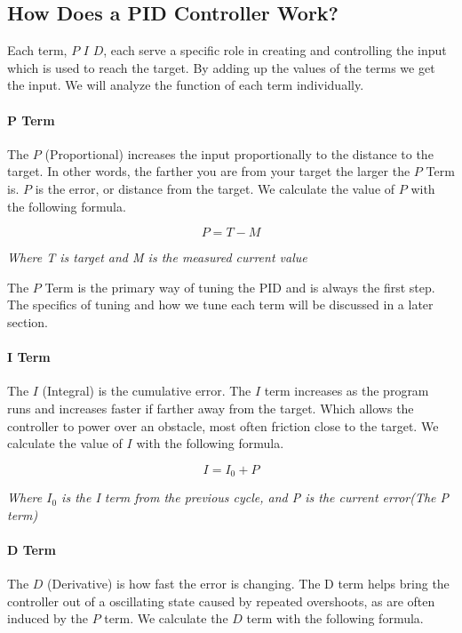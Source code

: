 \documentclass[12pt]{article}
\begin{document}
\subsection{How Does a PID Controller Work?} \label{howPID}
    Each term, $P$ $I$ $D$, each serve a specific role in creating and controlling the input which is used to reach the target. By adding up the values of the terms we get the input. We will analyze the function of each term individually.

\paragraph{P Term}
    The $P$ (Proportional) increases the input proportionally to the distance to the target. In other words, the farther you are from your target the larger the $P$ Term is. $P$ is the error, or distance from the target. We calculate the value of $P$ with the following formula.

    $$ P = T - M$$
    \begin{center}\em{Where T is target and M is the measured current value}\end{center}

    The $P$ Term is the primary way of tuning the PID and is always the first step. The specifics of tuning and how we tune each term will be discussed in a later section.

\paragraph{I Term}
    The $I$ (Integral) is the cumulative error. The $I$ term increases as the program runs and increases faster if farther away from the target. Which allows the controller to power over an obstacle, most often friction close to the target. We calculate the value of $I$ with the following formula.

    $$ I = I_0 + P$$
    \begin{center}\em{Where $I_0$ is the I term from the previous cycle, and P is the current error(The P term)}\end{center}

\paragraph{D Term}
    The $D$ (Derivative) is how fast the error is changing. The D term helps bring the controller out of a oscillating state caused by repeated overshoots, as are often induced by the $P$ term. We calculate the $D$ term with the following formula.
\end{document}
